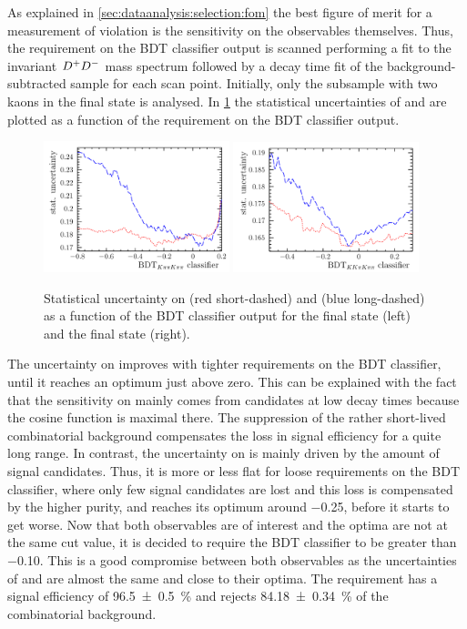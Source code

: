 As explained in \cref{sec:dataanalysis:selection:fom} the best figure of merit
for a measurement of \CP violation is the sensitivity on the \CP observables
themselves. Thus, the requirement on the BDT classifier output is scanned
performing a fit to the invariant ${{D}^+}{{D}^-}$ mass spectrum followed by a decay
time fit of the background-subtracted sample for each scan point. Initially,
only the subsample with two kaons in the \Bd final state is analysed. In
\cref{fig:b02dd:selection:mva:sensitivities} the statistical
uncertainties of \SDD and \CDD are plotted as a function of the requirement on
the BDT classifier output.
%
\begin{figure}[!htb]
\centering
\includegraphics[width=0.48\textwidth]{07-B02DD/tikz/pdf/Sensitivities_Kpipi.pdf}
\includegraphics[width=0.48\textwidth]{07-B02DD/tikz/pdf/Sensitivities_KKpi.pdf}
\caption{Statistical uncertainty on \SDD (red short-dashed) and \CDD (blue long-dashed) as
a function of the BDT classifier output for the \KpipiKpipi final state (left)
and the \KKpiKpipi final state (right).}
\label{fig:b02dd:selection:mva:sensitivities}
\end{figure}
%
The uncertainty on \CDD improves with tighter requirements on the BDT
classifier, until it reaches an optimum just above zero. This can be
explained with the fact that the sensitivity on \CDD mainly comes from
candidates at low decay times because the cosine function is maximal there.
The suppression of the rather short-lived combinatorial background compensates
the loss in signal efficiency for a quite long range. In contrast, the
uncertainty on \SDD is mainly driven by the amount of signal candidates. Thus, it
is more or less flat for loose requirements on the BDT classifier, where only
few signal candidates are lost and this loss is compensated by the higher purity,
and reaches its optimum around \num{-0.25}, before it starts to get worse. Now
that both observables are of interest and the optima are not at the same cut
value, it is decided to require the BDT classifier to be greater than
\num{-0.10}. This is a good compromise between both observables as the
uncertainties of \SDD and \CDD are almost the same and close to their optima.
The requirement has a signal efficiency of \SI{96.5\pm0.5}{\percent} and
rejects \SI{84.18\pm0.34}{\percent} of the combinatorial background.

